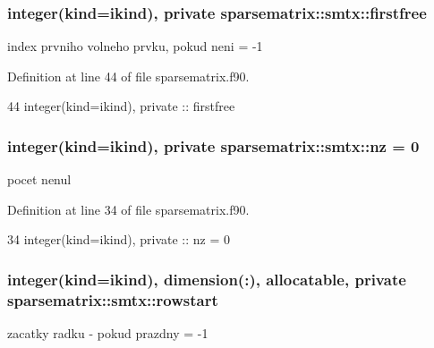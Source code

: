 \subsubsection[{firstfree}]{\setlength{\rightskip}{0pt plus 5cm}integer(kind=ikind), private sparsematrix\+::smtx\+::firstfree\hspace{0.3cm}{\ttfamily [private]}}\label{structsparsematrix_1_1smtx_a766d2c4014cea3ba785b8dc6cfde8b08}


index prvniho volneho prvku, pokud neni = -\/1 



Definition at line 44 of file sparsematrix.\+f90.


\begin{DoxyCode}
44         \textcolor{keywordtype}{integer(kind=ikind)}, \textcolor{keywordtype}{private} :: firstfree
\end{DoxyCode}
\subsubsection[{nz}]{\setlength{\rightskip}{0pt plus 5cm}integer(kind=ikind), private sparsematrix\+::smtx\+::nz = 0\hspace{0.3cm}{\ttfamily [private]}}\label{structsparsematrix_1_1smtx_aa58ec39c3f86f13053d12d41c8631c86}


pocet nenul 



Definition at line 34 of file sparsematrix.\+f90.


\begin{DoxyCode}
34         \textcolor{keywordtype}{integer(kind=ikind)}, \textcolor{keywordtype}{private} :: nz = 0
\end{DoxyCode}
\subsubsection[{rowstart}]{\setlength{\rightskip}{0pt plus 5cm}integer(kind=ikind), dimension(\+:), allocatable, private sparsematrix\+::smtx\+::rowstart\hspace{0.3cm}{\ttfamily [private]}}\label{structsparsematrix_1_1smtx_a47062ce7daa32001da708625ec97429b}


zacatky radku -\/ pokud prazdny = -\/1 



